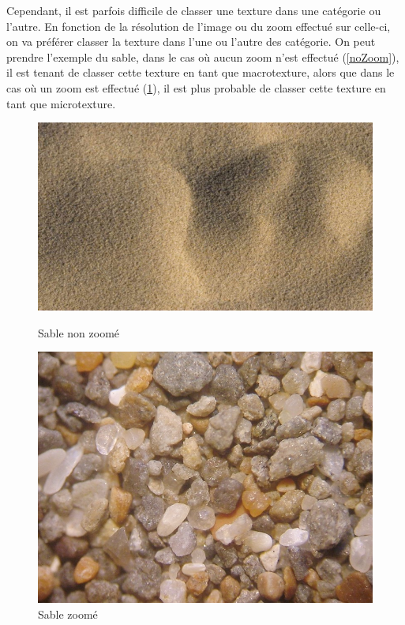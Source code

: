Cependant, il est parfois difficile de classer une texture dans une catégorie ou l'autre. En fonction de la résolution de l'image ou du zoom effectué sur celle-ci, on va préférer classer la texture dans l'une ou l'autre des catégorie. On peut prendre l'exemple du sable, dans le cas où aucun zoom n'est effectué (\ref{noZoom}), il est tenant de classer cette texture en tant que macrotexture, alors que dans le cas où un zoom est effectué (\ref{Zoom}), il est plus probable de classer cette texture en tant que microtexture.

\begin{figure}
   \begin{minipage}[c]{.46\linewidth}
	  \centering
      \includegraphics[scale=0.16]{img/sableNoZoom.jpg}
      \caption{\label{noZoom} Sable non zoomé}
   \end{minipage} \hfill
   \begin{minipage}[c]{.46\linewidth}
      \centering
      \includegraphics[scale=0.2]{img/sableZoom.jpg}
      \caption{\label{Zoom} Sable zoomé}
   \end{minipage}
\end{figure}

